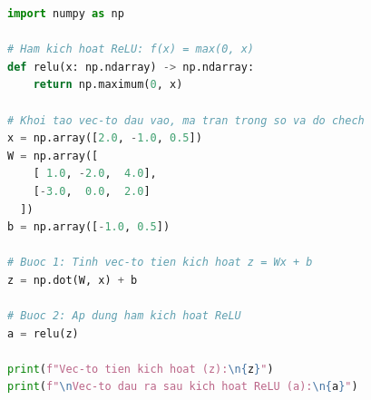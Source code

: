\begin{lstlisting}[caption={Mã Python biểu diễn tính toán theo ma trận - véc-tơ cho một lớp.}, language=Python]
import numpy as np

# Ham kich hoat ReLU: f(x) = max(0, x)
def relu(x: np.ndarray) -> np.ndarray:  
    return np.maximum(0, x)

# Khoi tao vec-to dau vao, ma tran trong so va do chech
x = np.array([2.0, -1.0, 0.5])
W = np.array([
    [ 1.0, -2.0,  4.0],
    [-3.0,  0.0,  2.0]
  ])
b = np.array([-1.0, 0.5])
    
# Buoc 1: Tinh vec-to tien kich hoat z = Wx + b
z = np.dot(W, x) + b
    
# Buoc 2: Ap dung ham kich hoat ReLU
a = relu(z)
    
print(f"Vec-to tien kich hoat (z):\n{z}")
print(f"\nVec-to dau ra sau kich hoat ReLU (a):\n{a}")
\end{lstlisting}